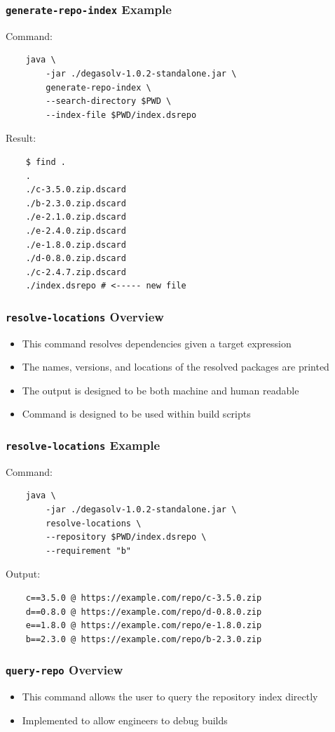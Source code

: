 \documentclass{beamer}
\begin{document}
\begin{frame}[fragile]
  \frametitle{\texttt{generate-repo-index} Example}
  Command:
\begin{verbatim}
    java \
        -jar ./degasolv-1.0.2-standalone.jar \
        generate-repo-index \
        --search-directory $PWD \
        --index-file $PWD/index.dsrepo
\end{verbatim}
  Result:
\begin{verbatim}
    $ find .
    .
    ./c-3.5.0.zip.dscard
    ./b-2.3.0.zip.dscard
    ./e-2.1.0.zip.dscard
    ./e-2.4.0.zip.dscard
    ./e-1.8.0.zip.dscard
    ./d-0.8.0.zip.dscard
    ./c-2.4.7.zip.dscard
    ./index.dsrepo # <----- new file
\end{verbatim}
\end{frame}
\begin{frame}
  \frametitle{\texttt{resolve-locations} Overview}
  \begin{itemize}
  \item This command resolves dependencies given a target expression
  \item The names, versions, and locations of the resolved packages are printed
  \item The output is designed to be both machine and human readable
  \item Command is designed to be used within build scripts
  \end{itemize}
\end{frame}
\begin{frame}[fragile]
  \frametitle{\texttt{resolve-locations} Example}
  Command:
\begin{verbatim}
    java \
        -jar ./degasolv-1.0.2-standalone.jar \
        resolve-locations \
        --repository $PWD/index.dsrepo \
        --requirement "b"
\end{verbatim}
  Output:
\begin{verbatim}
    c==3.5.0 @ https://example.com/repo/c-3.5.0.zip
    d==0.8.0 @ https://example.com/repo/d-0.8.0.zip
    e==1.8.0 @ https://example.com/repo/e-1.8.0.zip
    b==2.3.0 @ https://example.com/repo/b-2.3.0.zip
\end{verbatim}
\end{frame}
\begin{frame}
  \frametitle{\texttt{query-repo} Overview}
  \begin{itemize}
  \item This command allows the user to query the repository index directly
  \item Implemented to allow engineers to debug builds
  \end{itemize}
\end{frame}
\end{document}
